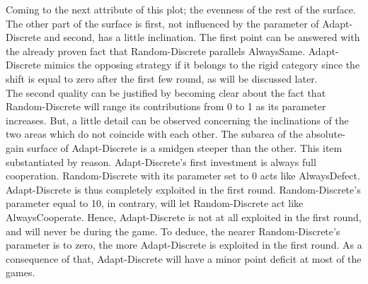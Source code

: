 \documentclass[11pt]{article}
\begin{document}
	Coming to the next attribute of this plot; the evenness of the rest of the surface.
	The other part of the surface is first, not influenced by the parameter of Adapt-Discrete and second, has a little inclination.
	The first point can be answered with the already proven fact that Random-Discrete parallels AlwaysSame.
	Adapt-Discrete mimics the opposing strategy if it belongs to the rigid category since the shift is equal to zero after the first few round, as will be discussed later.%
	\\
	The second quality can be justified by becoming clear about the fact that Random-Discrete will range its contributions from 0 to 1 as its parameter increases.
	But, a little detail can be observed concerning the inclinations of the two areas which do not coincide with each other.
	The subarea of the absolute-gain surface of Adapt-Discrete is a smidgen steeper than the other.
	This item substantiated by reason.
	Adapt-Discrete's first investment is always full cooperation.
	Random-Discrete with its parameter set to 0 acts like AlwaysDefect.
	Adapt-Discrete is thus completely exploited in the first round.
	Random-Discrete's parameter equal to 10, in contrary, will let Random-Discrete act like AlwaysCooperate.
	Hence, Adapt-Discrete is not at all exploited in the first round, and will never be during the game.
	To deduce, the nearer Random-Discrete's parameter is to zero, the more Adapt-Discrete is exploited in the first round.
	As a consequence of that, Adapt-Discrete will have a minor point deficit at most of the games.
\end{document}
